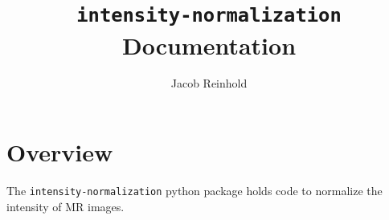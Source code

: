 \documentclass[12pt]{article}
\begin{document}
\title{\texttt{intensity-normalization} Documentation}
\author{Jacob Reinhold}

\maketitle

\section*{Overview}

The \texttt{intensity-normalization} python package holds code to normalize the
intensity of MR images.
\end{document}
